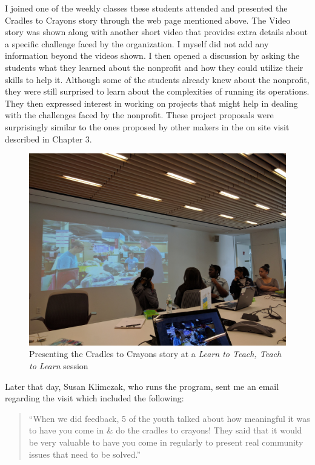 I joined one of the weekly classes these students attended and presented the Cradles to Crayons story through the web page mentioned above. The Video story was shown along with another short video that provides extra details about a specific challenge faced by the organization. I myself did not add any information beyond the videos shown. I then opened a discussion by asking the students what they learned about the nonprofit and how they could utilize their skills to help it. Although some of the students already knew about the nonprofit, they were still surprised to learn about the complexities of running its operations. They then expressed interest in working on projects that might help in dealing with the challenges faced by the nonprofit. These project proposals were surprisingly similar to the ones proposed by other makers in the on site visit described in Chapter 3.

\begin{figure}[thpb]
   \centering
   \includegraphics[width=\textwidth]{figures/learn2teach.jpg}
   \caption{Presenting the Cradles to Crayons story at a \textit{Learn to Teach, Teach to Learn} session}
   \label{fig_setc}
\end{figure}

Later that day, Susan Klimczak, who runs the program, sent me an email regarding the visit which included the following:

\begin{quotation}

``When we did feedback, 5 of the youth talked about how meaningful it was to have you come in \& do the cradles to crayons! They said that it would be very valuable to have you come in regularly to present real community issues that need to be solved.''

\end{quotation}

